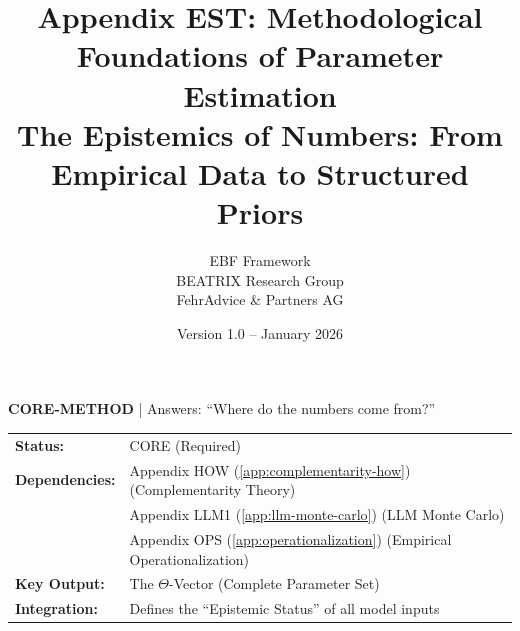\documentclass[11pt,a4paper]{article}
\title{Appendix EST: Methodological Foundations of Parameter Estimation\\
\large The Epistemics of Numbers: From Empirical Data to Structured Priors}
\author{EBF Framework\\BEATRIX Research Group\\FehrAdvice \& Partners AG}
\date{Version 1.0 -- January 2026}
\theoremstyle{definition}
\begin{document}
\maketitle

\begin{tcolorbox}[colback=blue!5!white, colframe=blue!75!black, title=Methodology Appendix]
\textbf{CORE-METHOD} | Answers: ``Where do the numbers come from?''

\begin{tabular}{ll}
\textbf{Status:} & CORE (Required) \\
\textbf{Dependencies:} & Appendix HOW (\ref{app:complementarity-how}) (Complementarity Theory) \\
 & Appendix LLM1 (\ref{app:llm-monte-carlo}) (LLM Monte Carlo) \\
 & Appendix OPS (\ref{app:operationalization}) (Empirical Operationalization) \\
\textbf{Key Output:} & The $\Theta$-Vector (Complete Parameter Set) \\
\textbf{Integration:} & Defines the ``Epistemic Status'' of all model inputs \\
\end{tabular}
\end{tcolorbox}

\tableofcontents
\newpage



%
%
%


\end{document}
